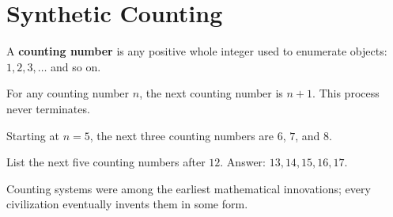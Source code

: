 \section{Synthetic Counting}
\label{sec:synth-counting}

\begin{keyterm}
\label{def:counting-number}
A \textbf{counting number} is any positive whole integer used to enumerate
objects: $1, 2, 3, \ldots$ and so on.
\end{keyterm}

\begin{property}
\label{prop:successor}
For any counting number $n$, the next counting number is $n + 1$. This
process never terminates.
\end{property}

\begin{example}
\label{ex:succ-list}
Starting at $n = 5$, the next three counting numbers are $6$, $7$, and $8$.
\end{example}

\begin{checkpoint}
\label{cp:try-count}
List the next five counting numbers after $12$. Answer: $13, 14, 15, 16, 17$.
\end{checkpoint}

\begin{note}[Historical]
\label{note:origin}
Counting systems were among the earliest mathematical innovations; every
civilization eventually invents them in some form.
\end{note}
